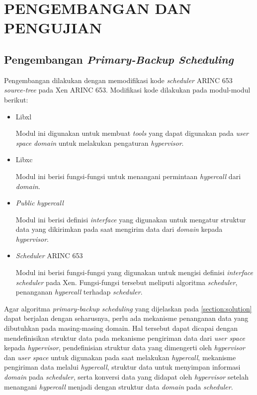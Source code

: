\chapter{PENGEMBANGAN DAN PENGUJIAN}

\section{Pengembangan \textit{Primary-Backup Scheduling}}

Pengembangan dilakukan dengan memodifikasi kode \textit{scheduler} ARINC 653 \textit{source-tree} pada Xen ARINC 653.
Modifikasi kode dilakukan pada modul-modul berikut:

\begin{itemize}

	\item Libxl

	Modul ini digunakan untuk membuat \textit{tools} yang dapat digunakan pada \textit{user space} \textit{domain}  untuk melakukan pengaturan \textit{hypervisor}.

	\item Libxc

	Modul ini berisi fungsi-fungsi untuk menangani permintaan \textit{hypercall} dari \textit{domain}.

	\item \textit{Public hypercall}

	Modul ini berisi definisi \textit{interface} yang digunakan untuk mengatur struktur data yang dikirimkan pada saat mengirim data dari \textit{domain} kepada \textit{hypervisor}.

	\item \textit{Scheduler} ARINC 653

	Modul ini berisi fungsi-fungsi yang digunakan untuk mengisi definisi \textit{interface} \textit{scheduler} pada Xen. Fungsi-fungsi tersebut meliputi algoritma \textit{scheduler}, penanganan \textit{hypercall} terhadap \textit{scheduler}.

\end{itemize}

Agar algoritma \textit{primary-backup scheduling} yang dijelaskan pada \autoref{section:solution} dapat berjalan dengan seharusnya, perlu ada mekanisme penanganan data yang dibutuhkan pada masing-masing domain. Hal tersebut dapat dicapai dengan mendefinisikan struktur data pada mekanisme pengiriman data dari \textit{user space} kepada \textit{hypervisor}, pendefinisian struktur data yang dimengerti oleh \textit{hypervisor} dan \textit{user space} untuk digunakan pada saat melakukan \textit{hypercall}, mekanisme pengiriman data melalui \textit{hypercall}, struktur data untuk menyimpan informasi \textit{domain} pada \textit{scheduler}, serta konversi data yang didapat oleh \textit{hypervisor} setelah menangani \textit{hypercall} menjadi dengan struktur data \textit{domain} pada \textit{scheduler}.

